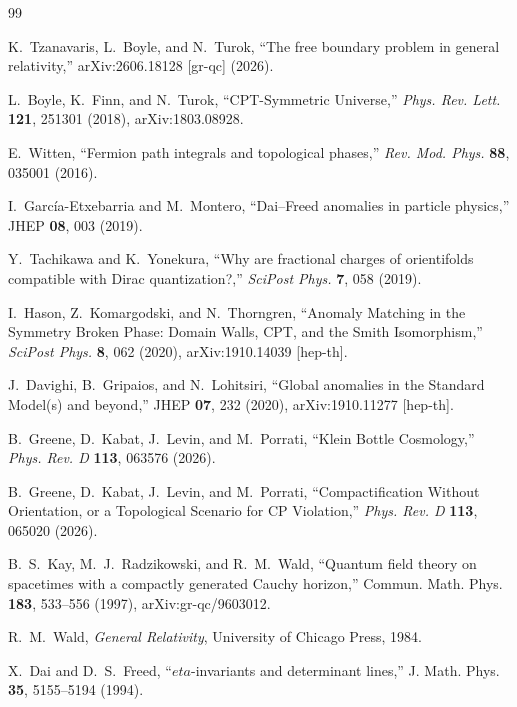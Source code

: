 \documentclass[11pt]{article}
\theoremstyle{canonmath}
\theoremstyle{canonpostulate}
\theoremstyle{canonclaim}
\def\eta{eta}%
\newcommand{\CanonBibliographySetup}{%
  \small
  \setlength{\parskip}{0.22em}
  \setlength{\itemsep}{0.55em}
}
\begin{document}
{}
\begin{thebibliography}{99}
\CanonBibliographySetup

K.~Tzanavaris, L.~Boyle, and N.~Turok, ``The free boundary problem in general relativity,'' arXiv:2606.18128 [gr-qc] (2026).

L.~Boyle, K.~Finn, and N.~Turok, ``CPT-Symmetric Universe,'' \textit{Phys. Rev. Lett.} \textbf{121}, 251301 (2018), arXiv:1803.08928.

E.~Witten, ``Fermion path integrals and topological phases,'' \textit{Rev. Mod. Phys.} \textbf{88}, 035001 (2016).

I.~Garc\'ia-Etxebarria and M.~Montero, ``Dai--Freed anomalies in particle physics,'' JHEP \textbf{08}, 003 (2019).

Y.~Tachikawa and K.~Yonekura, ``Why are fractional charges of orientifolds compatible with Dirac quantization?,'' \textit{SciPost Phys.} \textbf{7}, 058 (2019).

I.~Hason, Z.~Komargodski, and N.~Thorngren, ``Anomaly Matching in the Symmetry Broken Phase: Domain Walls, CPT, and the Smith Isomorphism,'' \textit{SciPost Phys.} \textbf{8}, 062 (2020), arXiv:1910.14039 [hep-th].

J.~Davighi, B.~Gripaios, and N.~Lohitsiri, ``Global anomalies in the Standard Model(s) and beyond,'' JHEP \textbf{07}, 232 (2020), arXiv:1910.11277 [hep-th].

B.~Greene, D.~Kabat, J.~Levin, and M.~Porrati, ``Klein Bottle Cosmology,'' \textit{Phys. Rev. D} \textbf{113}, 063576 (2026).

B.~Greene, D.~Kabat, J.~Levin, and M.~Porrati, ``Compactification Without Orientation, or a Topological Scenario for CP Violation,'' \textit{Phys. Rev. D} \textbf{113}, 065020 (2026).

B.~S.~Kay, M.~J.~Radzikowski, and R.~M.~Wald, ``Quantum field theory on spacetimes with a compactly generated Cauchy horizon,'' Commun. Math. Phys. \textbf{183}, 533--556 (1997), arXiv:gr-qc/9603012.

R.~M.~Wald, \textit{General Relativity}, University of Chicago Press, 1984.

X.~Dai and D.~S.~Freed, ``$\eta$-invariants and determinant lines,'' J. Math. Phys. \textbf{35}, 5155--5194 (1994).


\end{thebibliography}
\end{document}
